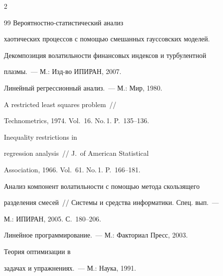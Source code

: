 \begin{multicols}{2}
{{\begin{thebibliography}{99}
Вероятностно-статистический анализ


хаотических процессов с помощью смешанных гауссовских моделей.


Декомпозиция волатильности финансовых индексов и турбулентной


плазмы.~--- М.: Изд-во ИПИРАН, 2007.









Линейный регрессионный анализ.~--- М.: Мир, 1980.









A restricted least squares problem~//


Technometrics, 1974. Vol.~16. No.\,1. P.~135--136.









Inequality restrictions in


regression analysis~// J.\ of American Statistical


Association, 1966. Vol.~61. No.\,1. P.~166--181.









Анализ компонент волатильности с помощью метода скользящего


разделения смесей~// Системы и средства информатики. Спец. вып.~---


М.: ИПИРАН, 2005. С.~180--206.









Линейное программирование.~--- М.: Факториал Пресс, 2003.


\label{end\stat}









Теория оптимизации в


задачах и упражнениях.~--- М.:  Наука, 1991.


\end{thebibliography}


}


}


\end{multicols}


